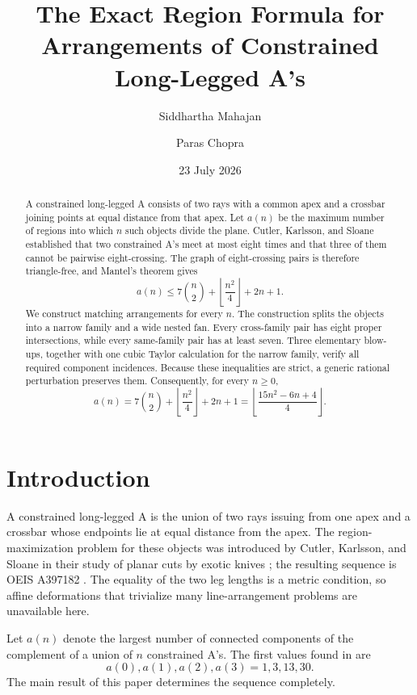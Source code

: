 \documentclass[11pt]{amsart}
\title[Constrained long-legged A arrangements]{The Exact Region Formula for Arrangements of Constrained Long-Legged A's}
\author{Siddhartha Mahajan}
\author{Paras Chopra}
\date{23 July 2026}
\theoremstyle{definition}
\begin{document}
\begin{abstract}
A constrained long-legged A consists of two rays with a common apex and a
crossbar joining points at equal distance from that apex.  Let $a(n)$ be the
maximum number of regions into which $n$ such objects divide the plane.
Cutler, Karlsson, and Sloane established that two constrained A's meet at most
eight times and that three of them cannot be pairwise eight-crossing.  The
graph of eight-crossing pairs is therefore triangle-free, and Mantel's
theorem gives
\[
 a(n)\le 7\binom n2+\left\lfloor\frac{n^2}{4}\right\rfloor+2n+1.
\]
We construct matching arrangements for every $n$.  The construction splits
the objects into a narrow family and a wide nested fan.  Every cross-family
pair has eight proper intersections, while every same-family pair has at
least seven.  Three elementary blow-ups, together with one cubic Taylor
calculation for the narrow family, verify all required component incidences.
Because these inequalities are strict, a generic rational perturbation
preserves them.  Consequently, for every $n\ge0$,
\[
 \boxed{\displaystyle
 a(n)=7\binom n2+\left\lfloor\frac{n^2}{4}\right\rfloor+2n+1
     =\left\lfloor\frac{15n^2-6n+4}{4}\right\rfloor.}
\]
\end{abstract}

\maketitle

\section{Introduction}

A constrained long-legged A is the union of two rays issuing from one apex
and a crossbar whose endpoints lie at equal distance from the apex.  The
region-maximization problem for these objects was introduced by Cutler,
Karlsson, and Sloane in their study of planar cuts by exotic knives
\cite{CKS2026}; the resulting sequence is OEIS A397182
\cite{OEISA397182}.  The equality of the two leg lengths is a metric
condition, so affine deformations that trivialize many line-arrangement
problems are unavailable here.

Let $a(n)$ denote the largest number of connected components of the
complement of a union of $n$ constrained A's.  The first values found in
\cite{CKS2026} are
\[
 a(0),a(1),a(2),a(3)=1,3,13,30.
\]
The main result of this paper determines the sequence completely.
\end{document}
